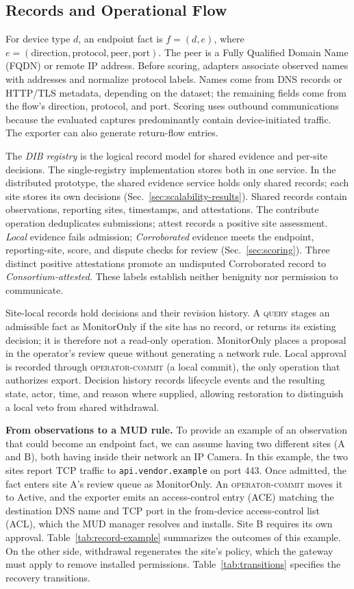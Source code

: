 \documentclass[journal]{IEEEtran}
\theoremstyle{definition}
\begin{document}
\subsection{Records and Operational Flow}
\label{subsec:endpoint-facts}
For device type $d$, an endpoint fact is $f=(d,e)$, where $e=(\text{direction},\text{protocol},\text{peer},\text{port})$. The peer is a Fully Qualified Domain Name (FQDN) or remote IP address. Before scoring, adapters associate observed names with addresses and normalize protocol labels. Names come from DNS records or HTTP/TLS metadata, depending on the dataset; the remaining fields come from the flow's direction, protocol, and port. Scoring uses outbound communications because the evaluated captures predominantly contain device-initiated traffic. The exporter can also generate return-flow entries.

The \emph{DIB registry} is the logical record model for shared evidence and per-site decisions. The single-registry implementation stores both in one service. In the distributed prototype, the shared evidence service holds only shared records; each site stores its own decisions (Sec.~\ref{sec:scalability-results}). Shared records contain observations, reporting sites, timestamps, and attestations. The contribute operation deduplicates submissions; attest records a positive site assessment. \emph{Local} evidence fails admission; \emph{Corroborated} evidence meets the endpoint, reporting-site, score, and dispute checks for review (Sec.~\ref{sec:scoring}). Three distinct positive attestations promote an undisputed Corroborated record to \emph{Consortium-attested}. These labels establish neither benignity nor permission to communicate.

Site-local records hold decisions and their revision history. A \textsc{query} stages an admissible fact as MonitorOnly if the site has no record, or returns its existing decision; it is therefore not a read-only operation. MonitorOnly places a proposal in the operator's review queue without generating a network rule. Local approval is recorded through \textsc{operator-commit} (a local commit), the only operation that authorizes export. Decision history records lifecycle events and the resulting state, actor, time, and reason where supplied, allowing restoration to distinguish a local veto from shared withdrawal.

\textbf{From observations to a MUD rule.} To provide an example of an observation that could become an endpoint fact, we can assume having two different sites (A and B), both having inside their network an IP Camera. In this example, the two sites report TCP traffic to \texttt{api.vendor.example} on port 443. Once admitted, the fact enters site A's review queue as MonitorOnly. An \textsc{operator-commit} moves it to Active, and the exporter emits an access-control entry (ACE) matching the destination DNS name and TCP port in the from-device access-control list (ACL), which the MUD manager resolves and installs. Site B requires its own approval. Table~\ref{tab:record-example} summarizes the outcomes of this example.
On the other side, withdrawal regenerates the site's policy, which the gateway must apply to remove installed permissions. Table~\ref{tab:transitions} specifies the recovery transitions.
\end{document}
